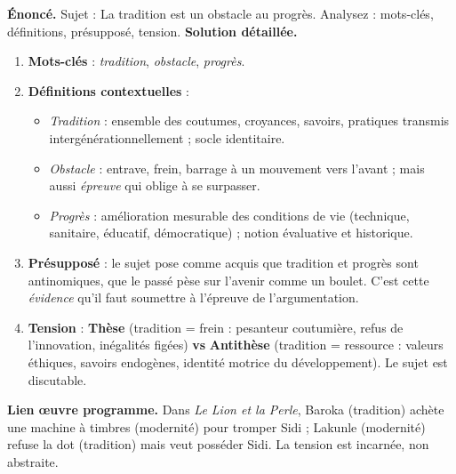\documentclass[11pt]{article}
\newcommand{\cle}[1]{{\popxbold\color{popdark}#1}}
\begin{document}
\begin{exoresolu}
\textbf{Énoncé.} Sujet : \og La tradition est un obstacle au progrès. \fg{} Analysez : mots-clés, définitions, présupposé, tension.
\tcblower
\textbf{Solution détaillée.}
\begin{enumerate}
\item \textbf{Mots-clés} : \emph{tradition}, \emph{obstacle}, \emph{progrès}.
\item \textbf{Définitions contextuelles} :
\begin{itemize}
\item \emph{Tradition} : ensemble des coutumes, croyances, savoirs, pratiques transmis intergénérationnellement ; socle identitaire.
\item \emph{Obstacle} : entrave, frein, barrage à un mouvement vers l'avant ; mais aussi \emph{épreuve} qui oblige à se surpasser.
\item \emph{Progrès} : amélioration mesurable des conditions de vie (technique, sanitaire, éducatif, démocratique) ; notion évaluative et historique.
\end{itemize}
\item \textbf{Présupposé} : le sujet pose comme acquis que tradition et progrès sont antinomiques, que le passé pèse sur l'avenir comme un boulet. C'est cette \emph{évidence} qu'il faut soumettre à l'épreuve de l'argumentation.
\item \textbf{Tension} : \textbf{Thèse} (tradition = frein : pesanteur coutumière, refus de l'innovation, inégalités figées) \textbf{vs} \textbf{Antithèse} (tradition = ressource : valeurs éthiques, savoirs endogènes, identité motrice du développement). Le sujet est \cle{discutable}.
\end{enumerate}
\textbf{Lien œuvre programme.} Dans \emph{Le Lion et la Perle}, Baroka (tradition) achète une machine à timbres (modernité) pour tromper Sidi ; Lakunle (modernité) refuse la dot (tradition) mais veut posséder Sidi. La tension est incarnée, non abstraite.
\end{exoresolu}
\end{document}
